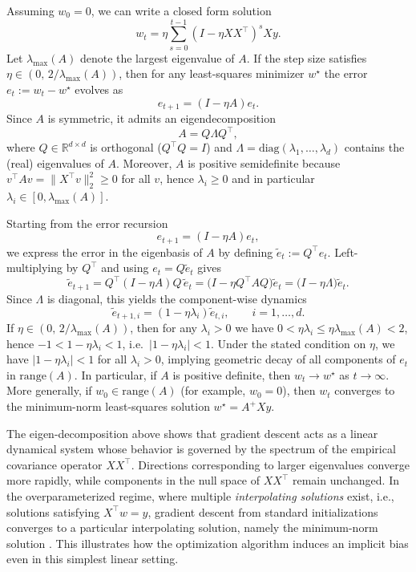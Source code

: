 Assuming $w_0=0$, we can write a closed form solution
\begin{equation}
	w_t
	=\eta \sum_{s=0}^{t-1}\left(I-\eta XX^\top\right)^s Xy.
\end{equation}
Let $\lambda_{\max}(A)$ denote the largest eigenvalue of $A$.
If the step size satisfies $\eta \in (0,\,2/\lambda_{\max}(A))$, then for any
least-squares minimizer $w^\star$ the error $e_t := w_t - w^\star$ evolves as
\begin{equation}
	e_{t+1} = (I - \eta A) e_t .
\end{equation}
Since $A$ is symmetric, it admits an eigendecomposition
\[
	A = Q\Lambda Q^\top,
\]
where $Q\in\mathbb{R}^{d\times d}$ is orthogonal ($Q^\top Q = I$) and
$\Lambda=\mathrm{diag}(\lambda_1,\dots,\lambda_d)$ contains the (real) eigenvalues
of $A$. Moreover, $A$ is positive semidefinite because
$v^\top A v = \|X^\top v\|_2^2 \ge 0$ for all $v$, hence $\lambda_i \ge 0$ and in
particular $\lambda_i \in [0,\lambda_{\max}(A)]$.

Starting from the error recursion
\[
	e_{t+1} = (I-\eta A)e_t,
\]
we express the error in the eigenbasis of $A$ by defining $\tilde e_t := Q^\top e_t$.
Left-multiplying by $Q^\top$ and using $e_t = Q\tilde e_t$ gives
\[
	\tilde e_{t+1}
	= Q^\top (I-\eta A) Q \,\tilde e_t
	= \bigl(I - \eta Q^\top A Q\bigr)\tilde e_t
	= \bigl(I - \eta \Lambda\bigr)\tilde e_t.
\]
Since $\Lambda$ is diagonal, this yields the component-wise dynamics
\begin{equation}\label{eq:componentwise-dynamics}
	\tilde e_{t+1,i} = (1-\eta \lambda_i)\tilde e_{t,i}, \qquad i=1,\dots,d.
\end{equation}
If $\eta \in (0,\,2/\lambda_{\max}(A))$, then for any $\lambda_i>0$ we have
$0<\eta\lambda_i \le \eta\lambda_{\max}(A) < 2$, hence
$-1 < 1-\eta\lambda_i < 1$, i.e.\ $|1-\eta\lambda_i|<1$.
Under the stated condition on $\eta$, we have $|1 - \eta \lambda_i| < 1$ for all
$\lambda_i > 0$, implying geometric decay of all components of $e_t$ in
$\mathrm{range}(A)$. In particular, if $A$ is positive definite, then
$w_t \to w^\star$ as $t \to \infty$. More generally, if $w_0 \in \mathrm{range}(A)$
(for example, $w_0 = 0$), then $w_t$ converges to the minimum-norm least-squares
solution $w^\star = A^{+}Xy$.

The eigen-decomposition above shows that gradient descent acts as a linear
dynamical system whose behavior is governed by the spectrum of the empirical
covariance operator $XX^\top$. Directions corresponding to larger eigenvalues
converge more rapidly, while components in the null space of $XX^\top$ remain
unchanged. In the overparameterized regime, where multiple \emph{interpolating
	solutions} exist, i.e., solutions satisfying $X^\top w = y$, gradient descent from
standard initializations converges to a particular interpolating solution,
namely the minimum-norm solution \citep{boyd2004convex, golub2013matrix}. This illustrates how the optimization algorithm
induces an implicit bias even in this simplest linear setting.

